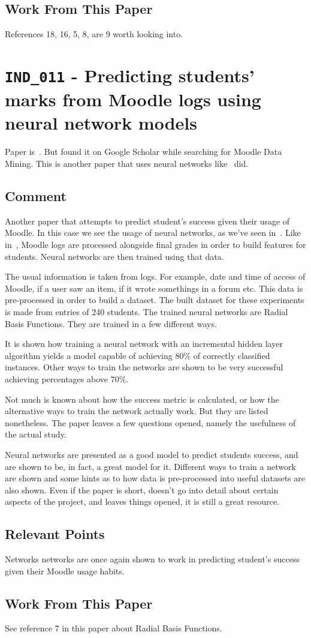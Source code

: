 \subsection{Work From This Paper}

References 18, 16, 5, 8, are 9 worth looking into.

\section{\texttt{IND\_011} - Predicting students' marks from Moodle logs using
neural network models}

Paper is~\cite{ind_011}. But found it on Google Scholar while searching for
Moodle Data Mining. This is another paper that uses neural networks
like~\cite{ind_009} did.

\subsection{Comment}

Another paper that attempts to predict student's success given their usage of
Moodle. In this case we see the usage of neural networks, as we've seen
in~\cite{ind_009}. Like in~\cite{ind_007, ind_008, ind_003, ind_010}, Moodle
logs are processed alongside final grades in order to build features for
students.  Neural networks are then trained using that data.

The usual information is taken from logs. For example, date and time of access
of Moodle, if a user saw an item, if it wrote somethings in a forum etc. This
data is pre-processed in order to build a dataset. The built dataset for these
experiments is made from entries of 240 students. The trained neural networks
are Radial Basis Functions. They are trained in a few different ways.

It is shown how training a neural network with an incremental hidden layer
algorithm yields a model capable of achieving 80\% of correctly classified
instances. Other ways to train the networks are shown to be very successful
achieving percentages above 70\%.

Not much is known about how the success metric is calculated, or how the
alternative ways to train the network actually work. But they are listed
nonetheless. The paper leaves a few questions opened, namely the usefulness of
the actual study.

Neural networks are presented as a good model to predict students success, and
are shown to be, in fact, a great model for it. Different ways to train a
network are shown and some hints as to how data is pre-processed into useful
datasets are also shown. Even if the paper is short, doesn't go into detail
about certain aspects of the project, and leaves things opened, it is still a
great resource.

\subsection{Relevant Points}

Networks networks are once again shown to work in predicting student's success
given their Moodle usage habits.

\subsection{Work From This Paper}

See reference 7 in this paper about Radial Basis Functions.
